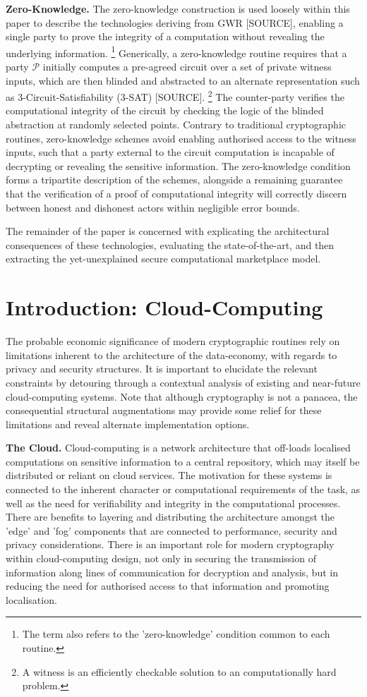 \documentclass[twocolumn]{scrartcl}
\begin{document}
\textbf{Zero-Knowledge.} The zero-knowledge construction is used loosely within this paper to describe the technologies deriving from GWR [SOURCE], enabling a single party to prove the integrity of a computation without revealing the underlying information. \footnote{The term also refers to the 'zero-knowledge' condition common to each routine.} Generically, a zero-knowledge routine requires that a party $\mathcal{P}$ initially computes a pre-agreed circuit over a set of private witness inputs, which are then blinded and abstracted to an alternate representation such as 3-Circuit-Satisfiability (3-SAT) [SOURCE]. \footnote{A witness is an efficiently checkable solution to an computationally hard problem.} The counter-party verifies the computational integrity of the circuit by checking the logic of the blinded abstraction at randomly selected points. Contrary to traditional cryptographic routines, zero-knowledge schemes avoid enabling authorised access to the witness inputs, such that a party external to the circuit computation is incapable of decrypting or revealing the sensitive information. The zero-knowledge condition forms a tripartite description of the schemes, alongside a remaining guarantee that the verification of a proof of computational integrity will correctly discern between honest and dishonest actors within negligible error bounds.

The remainder of the paper is concerned with explicating the architectural consequences of these technologies, evaluating the state-of-the-art, and then extracting the yet-unexplained secure computational marketplace model.

\section{Introduction: Cloud-Computing}
The probable economic significance of modern cryptographic routines rely on limitations inherent to the architecture of the data-economy, with regards to privacy and security structures. It is important to elucidate the relevant constraints by detouring through a contextual analysis of existing and near-future cloud-computing systems. Note that although cryptography is not a panacea, the consequential structural augmentations may provide some relief for these limitations and reveal alternate implementation options.

\textbf{The Cloud.} Cloud-computing is a network architecture that off-loads localised computations on sensitive information to a central repository, which may itself be distributed or reliant on cloud services. The motivation for these systems is connected to the inherent character or computational requirements of the task, as well as the need for verifiability and integrity in the computational processes. There are benefits to layering and distributing the architecture amongst the 'edge' and 'fog' components that are connected to performance, security and privacy considerations. There is an important role for modern cryptography within cloud-computing design, not only in securing the transmission of information along lines of communication for decryption and analysis, but in reducing the need for authorised access to that information and promoting localisation.
\end{document}
